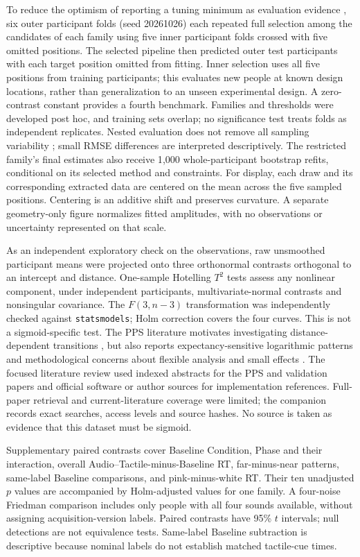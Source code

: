 To reduce the optimism of reporting a tuning minimum as evaluation evidence \citep{VarmaSimon2006}, six outer participant folds (seed 20261026) each repeated full selection among the candidates of each family using five inner participant folds crossed with five omitted positions. The selected pipeline then predicted outer test participants with each target position omitted from fitting. Inner selection uses all five positions from training participants; this evaluates new people at known design locations, rather than generalization to an unseen experimental design. A zero-contrast constant provides a fourth benchmark. Families and thresholds were developed post hoc, and training sets overlap; no significance test treats folds as independent replicates. Nested evaluation does not remove all sampling variability \citep{Varoquaux2017}; small RMSE differences are interpreted descriptively. The restricted family's final estimates also receive 1{,}000 whole-participant bootstrap refits, conditional on its selected method and constraints. For display, each draw and its corresponding extracted data are centered on the mean across the five sampled positions. Centering is an additive shift and preserves curvature. A separate geometry-only figure normalizes fitted amplitudes, with no observations or uncertainty represented on that scale.

As an independent exploratory check on the observations, raw unsmoothed participant means were projected onto three orthonormal contrasts orthogonal to an intercept and distance. One-sample Hotelling $T^2$ tests assess any nonlinear component, under independent participants, multivariate-normal contrasts and nonsingular covariance. The $F(3,n-3)$ transformation was independently checked against \texttt{statsmodels}; Holm correction covers the four curves. This is not a sigmoid-specific test. The PPS literature motivates investigating distance-dependent transitions \citep{canzoneri2012dynamic,noel2020rapid}, but also reports expectancy-sensitive logarithmic patterns \citep{hobeika2019capturing} and methodological concerns about flexible analysis and small effects \citep{holmes2020sounds}. The focused literature review used indexed abstracts for the PPS and validation papers and official software or author sources for implementation references. Full-paper retrieval and current-literature coverage were limited; the companion records exact searches, access levels and source hashes. No source is taken as evidence that this dataset must be sigmoid.

Supplementary paired contrasts cover Baseline Condition, Phase and their interaction, overall Audio--Tactile-minus-Baseline RT, far-minus-near patterns, same-label Baseline comparisons, and pink-minus-white RT. Their ten unadjusted $p$ values are accompanied by Holm-adjusted values for one family. A four-noise Friedman comparison includes only people with all four sounds available, without assigning acquisition-version labels. Paired contrasts have 95\% $t$ intervals; null detections are not equivalence tests. Same-label Baseline subtraction is descriptive because nominal labels do not establish matched tactile-cue times.

